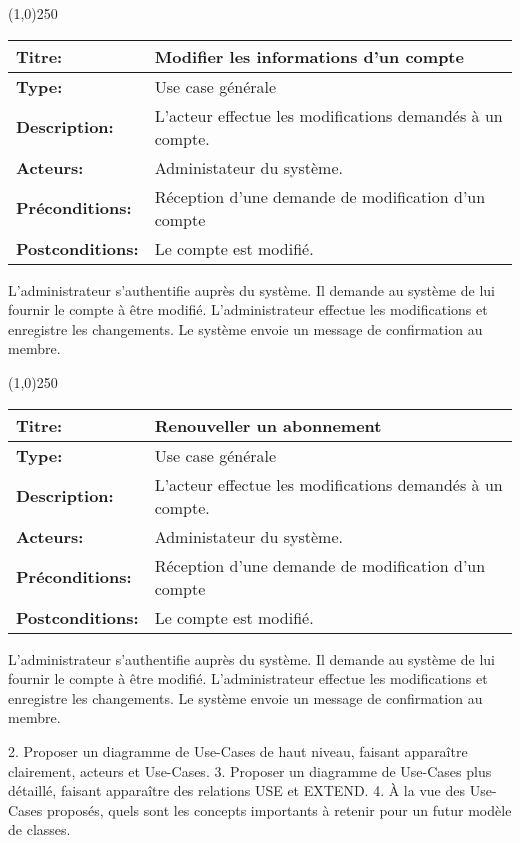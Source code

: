 \documentclass[letterpaper,11pt]{letter}
\begin{document}
\begin{center}
\line(1,0){250}
\end{center}

\begin{tabular}{|l|p{}|}
  \hline
{\bf Titre:} & Modifier les informations d'un compte\\
  \hline
{\bf Type:} & Use case générale\\
\hline
{\bf Description:} & L'acteur effectue les modifications demandés à un compte.\\
\hline
{\bf Acteurs:} & Administateur du système.\\
\hline
{\bf Préconditions:} & Réception d'une demande de modification d'un compte\\
\hline
{\bf Postconditions:} & Le compte est modifié.\\
\hline
\end{tabular}

L'administrateur s'authentifie auprès du système. Il demande au système de lui fournir le compte à être modifié. L'administrateur effectue les
modifications et enregistre les changements. Le système envoie un message de confirmation au membre.

\begin{center}
\line(1,0){250}
\end{center}

\begin{tabular}{|l|p{}|}
  \hline
{\bf Titre:} & Renouveller un abonnement\\
  \hline
{\bf Type:} & Use case générale\\
\hline
{\bf Description:} & L'acteur effectue les modifications demandés à un compte.\\
\hline
{\bf Acteurs:} & Administateur du système.\\
\hline
{\bf Préconditions:} & Réception d'une demande de modification d'un compte\\
\hline
{\bf Postconditions:} & Le compte est modifié.\\
\hline
\end{tabular}

L'administrateur s'authentifie auprès du système. Il demande au système de lui fournir le compte à être modifié. L'administrateur effectue les
modifications et enregistre les changements. Le système envoie un message de confirmation au membre.


2. Proposer un diagramme de Use-Cases de haut niveau, faisant apparaître
clairement, acteurs et Use-Cases.
3. Proposer un diagramme de Use-Cases plus détaillé, faisant apparaître des
relations USE et EXTEND.
4. À la vue des Use-Cases proposés, quels sont les concepts importants à
retenir pour un futur modèle de classes.
\end{document}
